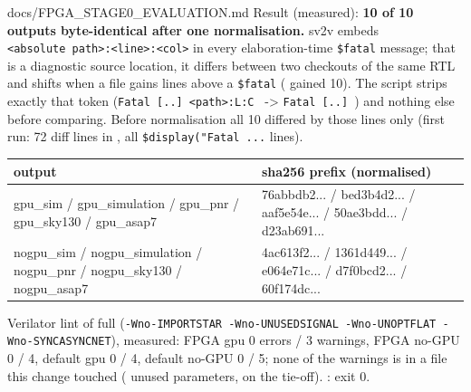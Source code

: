 \begin{relocated}{docs/FPGA_STAGE0_EVALUATION.md}
Result (measured): \textbf{10 of 10 outputs byte-identical after one
normalisation.} sv2v embeds
\texttt{<absolute\ path>:\allowbreak{}<line>:\allowbreak{}<col>} in
every elaboration-time \texttt{\$fatal} message; that is a diagnostic
source location, it differs between two checkouts of the same RTL and
shifts when a file gains lines above a \texttt{\$fatal}
( gained 10). The script strips exactly that
token
(\texttt{Fatal\ [.\allowbreak{}.\allowbreak{}]\ <path>:\allowbreak{}L:\allowbreak{}C\ }
-\textgreater{} \texttt{Fatal\ [.\allowbreak{}.\allowbreak{}]\ }) and
nothing else before comparing. Before normalisation all 10 differed by
those lines only (first run: 72 diff lines in , all
\texttt{\$display("Fatal\ .\allowbreak{}.\allowbreak{}.\allowbreak{}}
lines).

{\small\setlength{\tabcolsep}{4pt}

{
\begin{longtable}[]{@{}
  >{\raggedright\arraybackslash}p{}
  >{\raggedright\arraybackslash}p{}@{}}
\toprule\noalign{}
\begin{minipage}[b]{\linewidth}\raggedright
output
\end{minipage} & \begin{minipage}[b]{\linewidth}\raggedright
sha256 prefix (normalised)
\end{minipage} \\
\midrule\noalign{}
\endhead
\bottomrule\noalign{}
\endlastfoot
gpu\_sim / gpu\_\allowbreak{}simulation / gpu\_pnr /
gpu\_\allowbreak{}sky130 / gpu\_asap7 & 76abbdb2... / bed3b4d2... /
aaf5e54e... / 50ae3bdd... / d23ab691... \\
nogpu\_sim / nogpu\_\allowbreak{}simulation / nogpu\_pnr /
nogpu\_\allowbreak{}sky130 / nogpu\_\allowbreak{}asap7 & 4ac613f2... /
1361d449... / e064e71c... / d7f0bcd2... / 60f174dc... \\
\end{longtable}
}

}

Verilator  lint of full 
(\texttt{-\allowbreak{}Wno-\allowbreak{}IMPORTSTAR\ -\allowbreak{}Wno-\allowbreak{}UNUSEDSIGNAL\ -\allowbreak{}Wno-\allowbreak{}UNOPTFLAT\ -\allowbreak{}Wno-\allowbreak{}SYNCASYNCNET}),
measured: FPGA gpu 0 errors / 3 warnings, FPGA no-GPU 0 / 4, default gpu
0 / 4, default no-GPU 0 / 5; none of the warnings is in a file this
change touched ( unused parameters,
 on the tie-off).
: exit 0.


\end{relocated}
